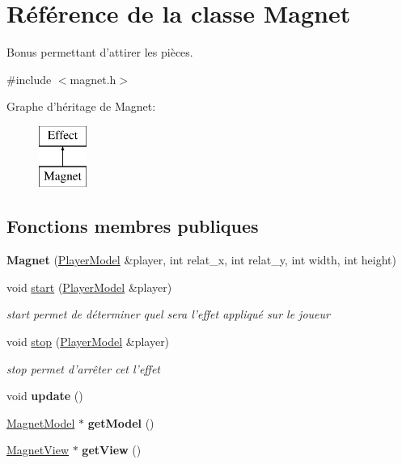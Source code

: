\hypertarget{class_magnet}{\section{Référence de la classe Magnet}
\label{class_magnet}
}


Bonus permettant d'attirer les pièces.  




{\ttfamily \#include $<$magnet.\+h$>$}

Graphe d'héritage de Magnet\+:\begin{figure}[H]
\begin{center}
\leavevmode
\includegraphics[height=2.000000cm]{class_magnet}
\end{center}
\end{figure}
\subsection*{Fonctions membres publiques}
\begin{DoxyCompactItemize}
\item 
\hypertarget{class_magnet_a68abbf92fe56c306ca711e54d8da2798}{{\bfseries Magnet} (\hyperlink{class_player_model}{Player\+Model} \&player, int relat\+\_\+x, int relat\+\_\+y, int width, int height)}\label{class_magnet_a68abbf92fe56c306ca711e54d8da2798}

\item 
void \hyperlink{class_magnet_af912cb148885faaf5281f80dbd3725df}{start} (\hyperlink{class_player_model}{Player\+Model} \&player)
\begin{DoxyCompactList}\small\item\em start permet de déterminer quel sera l'effet appliqué sur le joueur \end{DoxyCompactList}\item 
void \hyperlink{class_magnet_aa387ca561e4de8706ec7bf92ff51e009}{stop} (\hyperlink{class_player_model}{Player\+Model} \&player)
\begin{DoxyCompactList}\small\item\em stop permet d'arrêter cet l'effet \end{DoxyCompactList}\item 
\hypertarget{class_magnet_ab51390971d0c636be58ca96d0b054f5b}{void {\bfseries update} ()}\label{class_magnet_ab51390971d0c636be58ca96d0b054f5b}

\item 
\hypertarget{class_magnet_a37a302348dd7035b7f484c53fc56e75d}{\hyperlink{class_magnet_model}{Magnet\+Model} $\ast$ {\bfseries get\+Model} ()}\label{class_magnet_a37a302348dd7035b7f484c53fc56e75d}

\item 
\hypertarget{class_magnet_a880ecabe9c3e8e1fa0a7029913703208}{\hyperlink{class_magnet_view}{Magnet\+View} $\ast$ {\bfseries get\+View} ()}\label{class_magnet_a880ecabe9c3e8e1fa0a7029913703208}

\end{DoxyCompactItemize}


